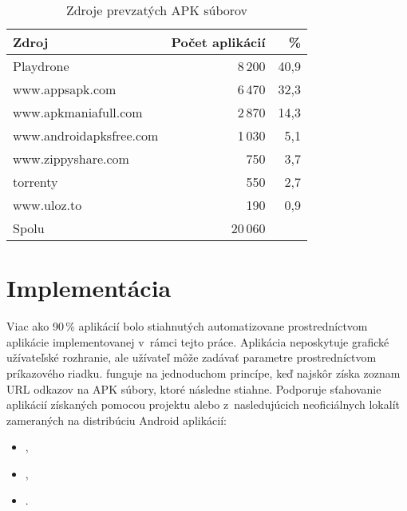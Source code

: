 \begin{table}[htb]
\centering
  \begin{tabular}{|l r r|}
    \hline
    \textbf{Zdroj} & \textbf{Počet aplikácií} & \textbf{\%} \\\hline\hline
    Playdrone & 8\,200 & 40,9\\
    www.appsapk.com & 6\,470 & 32,3\\
    www.apkmaniafull.com & 2\,870 & 14,3\\
    www.androidapksfree.com & 1\,030 & 5,1\\
    www.zippyshare.com & 750 & 3,7\\
    torrenty & 550 & 2,7\\
    www.uloz.to & 190 & 0,9\\
    \midrule\hline
    Spolu & 20\,060 & \\
    \hline
  \end{tabular}
  \caption{Zdroje prevzatých APK súborov}
  \label{tab:stahovanie}
\end{table}


\section{Implementácia}
Viac ako 90\,\% aplikácií bolo stiahnutých automatizovane prostredníctvom aplikácie  implementovanej v~rámci tejto práce. Aplikácia neposkytuje grafické užívateľské rozhranie, ale užívateľ môže zadávať parametre prostredníctvom príkazového riadku.  funguje na jednoduchom princípe, keď najskôr získa zoznam URL odkazov na APK súbory, ktoré následne stiahne. Podporuje sťahovanie aplikácií získaných pomocou projektu  alebo z~nasledujúcich neoficiálnych lokalít zameraných na distribúciu Android aplikácií: 
\begin{itemize}
 \item {},
 \item {},
 \item {}.
\end{itemize}

